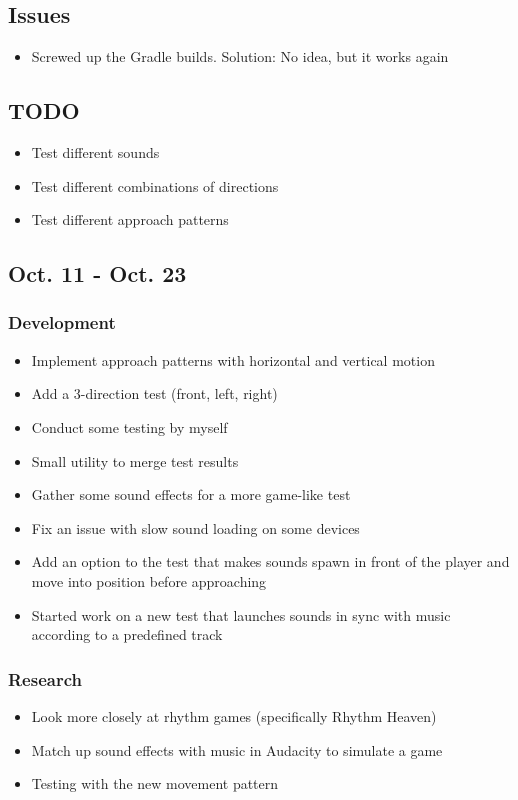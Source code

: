 \documentclass{article}
\begin{document}
\subsection{Issues}
\begin{itemize}
    \item Screwed up the Gradle builds. Solution: No idea, but it works again
\end{itemize}
\subsection{TODO}
\begin{itemize}
    \item Test different sounds
    \item Test different combinations of directions
    \item Test different approach patterns
\end{itemize}
\subsection{Oct. 11 - Oct. 23}
\subsubsection{Development}
\begin{itemize}
    \item Implement approach patterns with horizontal and vertical motion
    \item Add a 3-direction test (front, left, right)
    \item Conduct some testing by myself
    \item Small utility to merge test results
    \item Gather some sound effects for a more game-like test
    \item Fix an issue with slow sound loading on some devices
    \item Add an option to the test that makes sounds spawn in front of the player and move into position before approaching
    \item Started work on a new test that launches sounds in sync with music according to a predefined track
\end{itemize}
\subsubsection{Research}
\begin{itemize}
    \item Look more closely at rhythm games (specifically Rhythm Heaven)
    \item Match up sound effects with music in Audacity to simulate a game
    \item Testing with the new movement pattern
\end{itemize}
\end{document}
